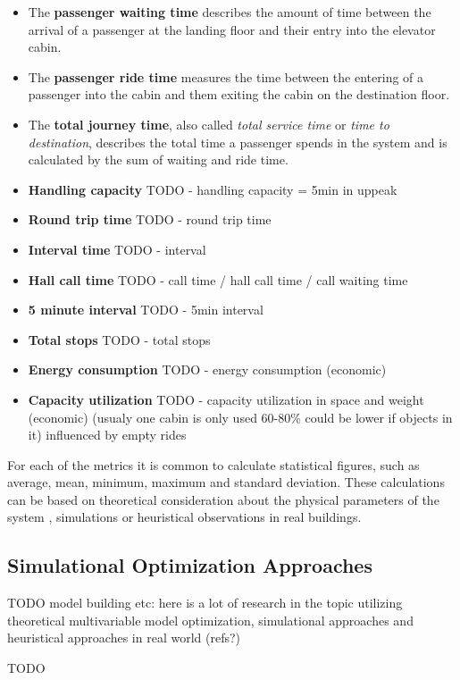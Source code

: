 \begin{itemize}
    \item The \textbf{passenger waiting time} 
        describes the amount of time between the arrival of a passenger at the landing floor 
        and their entry into the elevator cabin. 
        \autocite[][p.~7]{hakonen2003simulation}\autocite[][pp.8-9]{siikonen1997models}
    \item The \textbf{passenger ride time} 
        measures the time between the entering of a passenger into the cabin 
        and them exiting the cabin on the destination floor. 
    \autocite[][pp.8-9]{siikonen1997models}
    \item The \textbf{total journey time}, 
        also called \emph{total service time} \autocite[][p.~10]{beers2015arrivals} or \emph{time to destination},
        describes the total time a passenger spends in the system 
        and is calculated by the sum of waiting and ride time.
        \autocite[][pp.8-9]{siikonen1997models}
    \item \textbf{Handling capacity} TODO - handling capacity = 5min in uppeak \autocite[][pp.8-9]{siikonen1997models}
    \item \textbf{Round trip time} TODO - round trip time
    \item \textbf{Interval time} TODO - interval
    \item \textbf{Hall call time} TODO - call time / hall call time / call waiting time
    \item \textbf{5 minute interval} TODO - 5min interval \autocite[][p.~194]{unger2015aufzuege}
    \item \textbf{Total stops} TODO - total stops
        \item \textbf{Energy consumption} TODO - energy consumption (economic)
    \item \textbf{Capacity utilization} TODO - capacity utilization in space and weight (economic)
        (usualy one cabin is only used 60-80\% could be lower if objects in it)
        \autocite[][p.~194]{unger2015aufzuege}
        \autocite[][p.~7]{hakonen2003simulation}
        influenced by empty rides
\end{itemize}

For each of the metrics it is common to calculate statistical figures, such as average, mean, minimum, maximum and standard deviation.
These calculations can be based on theoretical consideration about the physical parameters of the system \autocite[][p.~194]{unger2015aufzuege}, simulations or heuristical observations in real buildings.
 



\subsection{Simulational Optimization Approaches}
TODO
model building etc: here is a lot of research in the topic utilizing theoretical multivariable model optimization, simulational approaches and heuristical approaches in real world (refs?)

\autocite[][pp.~7--11]{beers2015arrivals}
\autocite[][p.~193]{unger2015aufzuege}


TODO
